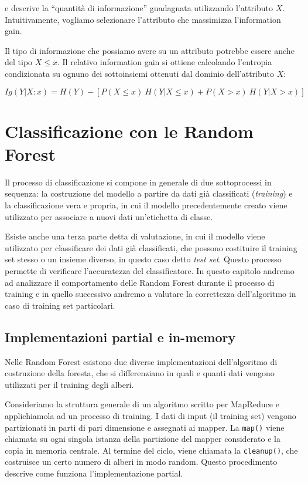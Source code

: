 \documentclass[a4paper,11pt,twoside,openright,fleqn]{book}
\newcommand{\code}[1]{\texttt{#1}}
\begin{document}
e descrive la ``quantità di informazione'' guadagnata utilizzando l'attributo $X$. Intuitivamente, vogliamo selezionare l'attributo che massimizza l'information gain.

Il tipo di informazione che possiamo avere su un attributo potrebbe essere anche del tipo $X \leq x$. Il relativo information gain si ottiene calcolando l'entropia condizionata su ognuno dei sottoinsiemi ottenuti dal dominio dell'attributo $X$:

\begin{equation}
\textit{Ig}(Y|X:x) = H(Y) - \left[ P(X \leq x) \: H(Y|X \leq x) + P(X > x) \: H(Y|X > x) \right]
\end{equation}

\chapter{Classificazione con le Random Forest}

Il processo di classificazione si compone in generale di due sottoprocessi in sequenza: la costruzione del modello a partire da dati già classificati (\emph{training}) e la classificazione vera e propria, in cui il modello precedentemente creato viene utilizzato per associare a nuovi dati un'etichetta di classe.

Esiste anche una terza parte detta di valutazione, in cui il modello viene utilizzato per classificare dei dati già classificati, che possono costituire il training set stesso o un insieme diverso, in questo caso detto \emph{test set}. Questo processo permette di verificare l'accuratezza del classificatore. In questo capitolo andremo ad analizzare il comportamento delle Random Forest durante il processo di training e in quello successivo andremo a valutare la correttezza dell'algoritmo in caso di training set particolari.

\section{Implementazioni partial e in-memory}

Nelle Random Forest esistono due diverse implementazioni dell'algoritmo di costruzione della foresta, che si differenziano in quali e quanti dati vengono utilizzati per il training degli alberi.

Consideriamo la struttura generale di un algoritmo scritto per MapReduce e applichiamola ad un processo di training. I dati di input (il training set) vengono partizionati in parti di pari dimensione e assegnati ai mapper. La \code{map()} viene chiamata su ogni singola istanza della partizione del mapper considerato e la copia in memoria centrale. Al termine del ciclo, viene chiamata la \code{cleanup()}, che costruisce un certo numero di alberi in modo random. Questo procedimento descrive come funziona l'implementazione partial.
\end{document}
